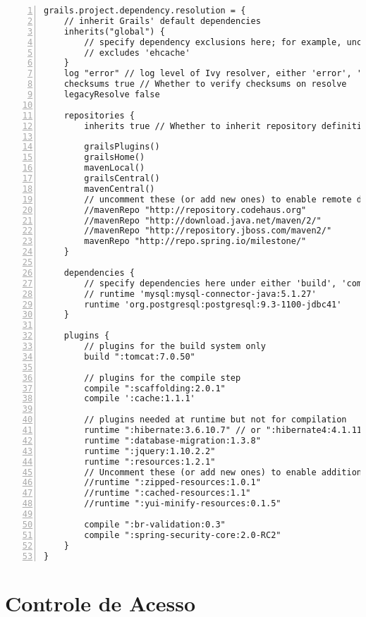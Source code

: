 \begin{lstlisting}[numbers=left, caption={\bf BuildConfig.groovy}, frame = trBL,
    float=htbp, label=codBuildConfig2]
grails.project.dependency.resolution = {
    // inherit Grails' default dependencies
    inherits("global") {
        // specify dependency exclusions here; for example, uncomment this to disable ehcache:
        // excludes 'ehcache'
    }
    log "error" // log level of Ivy resolver, either 'error', 'warn', 'info', 'debug' or 'verbose'
    checksums true // Whether to verify checksums on resolve
    legacyResolve false 

    repositories {
        inherits true // Whether to inherit repository definitions from plugins

        grailsPlugins()
        grailsHome()
        mavenLocal()
        grailsCentral()
        mavenCentral()
        // uncomment these (or add new ones) to enable remote dependency resolution from public Maven repositories
        //mavenRepo "http://repository.codehaus.org"
        //mavenRepo "http://download.java.net/maven/2/"
        //mavenRepo "http://repository.jboss.com/maven2/"
        mavenRepo "http://repo.spring.io/milestone/"
    }

    dependencies {
        // specify dependencies here under either 'build', 'compile', 'runtime', 'test' or 'provided' scopes e.g.
        // runtime 'mysql:mysql-connector-java:5.1.27'
        runtime 'org.postgresql:postgresql:9.3-1100-jdbc41'
    }

    plugins {
        // plugins for the build system only
        build ":tomcat:7.0.50"

        // plugins for the compile step
        compile ":scaffolding:2.0.1"
        compile ':cache:1.1.1'

        // plugins needed at runtime but not for compilation
        runtime ":hibernate:3.6.10.7" // or ":hibernate4:4.1.11.6"
        runtime ":database-migration:1.3.8"
        runtime ":jquery:1.10.2.2"
        runtime ":resources:1.2.1"
        // Uncomment these (or add new ones) to enable additional resources capabilities
        //runtime ":zipped-resources:1.0.1"
        //runtime ":cached-resources:1.1"
        //runtime ":yui-minify-resources:0.1.5"
        
        compile ":br-validation:0.3"
        compile ":spring-security-core:2.0-RC2"
    }
}
\end{lstlisting}

\newpage

\section{Controle de Acesso}

